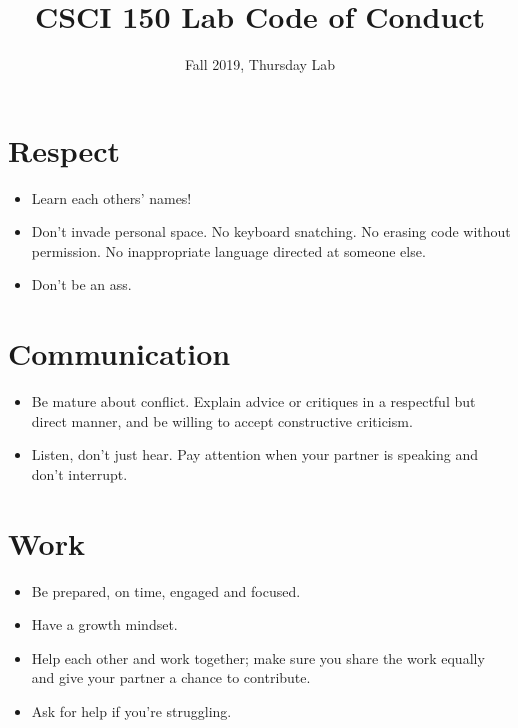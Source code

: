 \documentclass{tufte-handout}
\title{CSCI 150 Lab Code of Conduct}
\date{Fall 2019, Thursday Lab}
\begin{document}
\maketitle

\section{Respect}

\begin{itemize}
  \item Learn each others' names!

  \item Don't invade personal space.  No keyboard snatching. No erasing code
  without permission. No inappropriate language directed at someone else.

  \item Don't be an ass.
\end{itemize}

\section{Communication}

\begin{itemize}
  \item Be mature about conflict. Explain advice or critiques in a
  respectful but direct manner, and be willing to accept constructive
  criticism.

  \item Listen, don't just hear. Pay attention when your partner is speaking
  and don't interrupt.
\end{itemize}

\section{Work}

\begin{itemize}
  \item Be prepared, on time, engaged and focused.

  \item Have a growth mindset.

  \item Help each other and work together; make sure you share the work
  equally and give your partner a chance to contribute.

  \item Ask for help if you're struggling.
\end{itemize}
\end{document}

